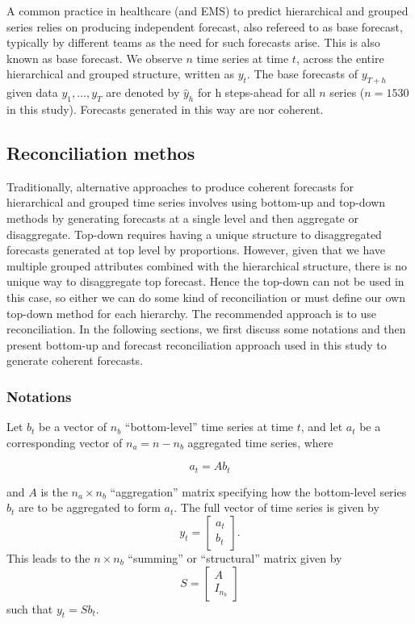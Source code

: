 \documentclass[
  authoryear,
  preprint,
  3p]{elsarticle}
\begin{document}
A common practice in healthcare (and EMS) to predict hierarchical and
grouped series relies on producing independent forecast, also refereed
to as base forecast, typically by different teams as the need for such
forecasts arise. This is also known as base forecast. We observe \(n\)
time series at time \(t\), across the entire hierarchical and grouped
structure, written as \(y_t\). The base forecasts of \(y_{T+h}\) given
data \(y_1,\dots,y_T\) are denoted by \(\hat{y}_h\) for h steps-ahead
for all \(n\) series (\(n=1530\) in this study). Forecasts generated in
this way are nor coherent.

\hypertarget{reconciliation-methos}{%
\subsection{Reconciliation methos}\label{reconciliation-methos}}

Traditionally, alternative approaches to produce coherent forecasts for
hierarchical and grouped time series involves using bottom-up and
top-down methods by generating forecasts at a single level and then
aggregate or disaggregate. Top-down requires having a unique structure
to disaggregated forecasts generated at top level by proportions.
However, given that we have multiple grouped attributes combined with
the hierarchical structure, there is no unique way to disaggregate top
forecast. Hence the top-down can not be used in this case, so either we
can do some kind of reconciliation or must define our own top-down
method for each hierarchy. The recommended approach is to use
reconciliation. In the following sections, we first discuss some
notations and then present bottom-up and forecast reconciliation
approach used in this study to generate coherent forecasts.

\hypertarget{notations}{%
\subsubsection{Notations}\label{notations}}

Let \(b_t\) be a vector of \(n_b\) ``bottom-level'' time series at time
\(t\), and let \(a_t\) be a corresponding vector of \(n_a = n-n_b\)
aggregated time series, where

\[
 a_t = Ab_t
\]

and \(A\) is the \(n_a\times n_b\) ``aggregation'' matrix specifying how
the bottom-level series \(b_t\) are to be aggregated to form \(a_t\).
The full vector of time series is given by \[
 y_t = \begin{bmatrix}a_t \\b_t\end{bmatrix}.
\] This leads to the \(n\times n_b\) ``summing'' or ``structural''
matrix given by \[
  S = \begin{bmatrix}A \\ I_{n_b}\end{bmatrix}
\] such that \(y_t = Sb_t\).
\end{document}
